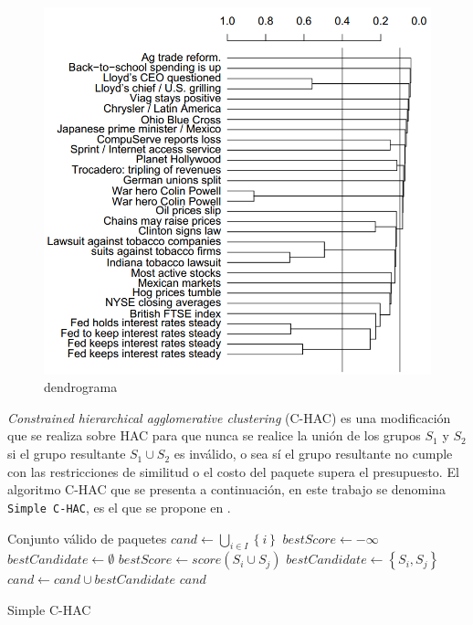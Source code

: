 \begin{figure}[H]
  \centering
    \includegraphics[width=1\textwidth]{img/Dendrogram.png}
  \caption{dendrograma}
  \label{des:Dendrogram}
\end{figure}

\textit{Constrained hierarchical agglomerative clustering} (C-HAC) es una modificación que se realiza sobre HAC para que nunca se realice la unión de los grupos $S_1$ y $S_2$ si el grupo resultante $S_1 \cup S_2$ es inválido, o sea sí el grupo resultante no cumple con las restricciones de similitud o el costo del paquete supera el presupuesto. El algoritmo C-HAC que se presenta a continuación, en este trabajo se denomina \texttt{Simple C-HAC}, es el que se propone en \cite{compositeRetrival}.

\begin{algorithm}[H]
\begin{algorithmic}[1]
\ENSURE Conjunto válido de paquetes
\STATE $cand \leftarrow \bigcup_{i \in I}\left\{i\right\}$
	\STATE $bestScore \leftarrow -\infty$
	\STATE $bestCandidate \leftarrow \emptyset$
			 \label{validMerge}
				 \label{score}
					\STATE $bestScore \leftarrow score(S_i \cup  S_j)$
					\STATE $bestCandidate \leftarrow \left\{S_i,S_j\right\}$
				\ENDIF
			\ENDIF
		\ENDFOR
	\ENDFOR
		\BREAK
	\ENDIF
	\STATE $cand \leftarrow cand \cup bestCandidate $
\ENDWHILE
\RETURN $cand$
\end{algorithmic}
\caption{Simple C-HAC}\label{alg:SimpleC-HAC}
\end{algorithm}

